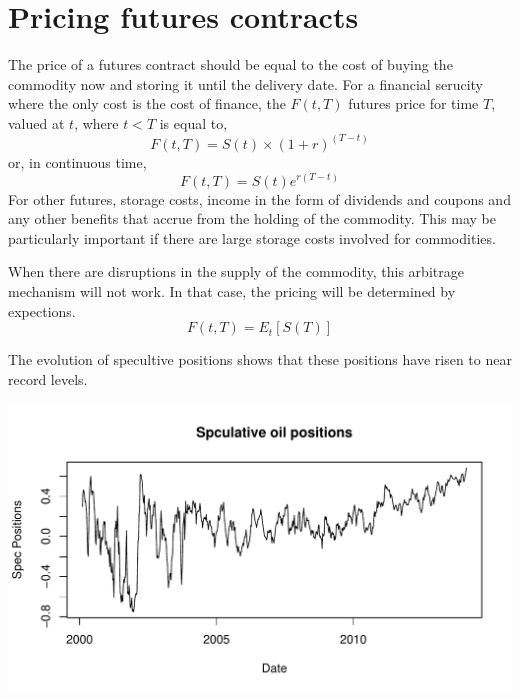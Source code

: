 \documentclass[12pt, a4paper, oneside]{article}\usepackage[]{graphicx}\usepackage[]{color}
\makeatletter
\def\maxwidth{ %
  \ifdim\Gin@nat@width>\linewidth
    \linewidth
  \else
    \Gin@nat@width
  \fi
}
\newenvironment{knitrout}{}{} %
\makeatother
\begin{document}
\section*{Pricing futures contracts}
The price of a futures contract should be equal to the cost of buying the commodity now and storing it until the delivery date.  For a financial serucity where the only cost is the cost of finance, the $F(t, T)$ futures price for time $T$, valued at $t$, where $t<T$ is equal to, 
\begin{equation*}
F(t, T) = S(t) \times (1 +r)^{(T-t)}
\end{equation*}
or, in continuous time, 
\begin{equation*}
F(t, T) = S(t)e^{r(T-t)}
\end{equation*}
For other futures, storage costs, income in the form of dividends and coupons and any other benefits that accrue from the holding of the commodity. This may be particularly important if there are large storage costs involved for commodities.

When there are disruptions in the supply of the commodity, this arbitrage mechanism will not work. In that case, the pricing will be determined by expections. 
\begin{equation*}
F(t, T) = E_t[S(T)]
\end{equation*}

The evolution of specultive positions shows that these positions have risen to near record levels.   
\begin{knitrout}
\color{fgcolor}

{\centering \includegraphics[width=\maxwidth]{figure/Oilspec} 

}



\end{knitrout}
\end{document}
